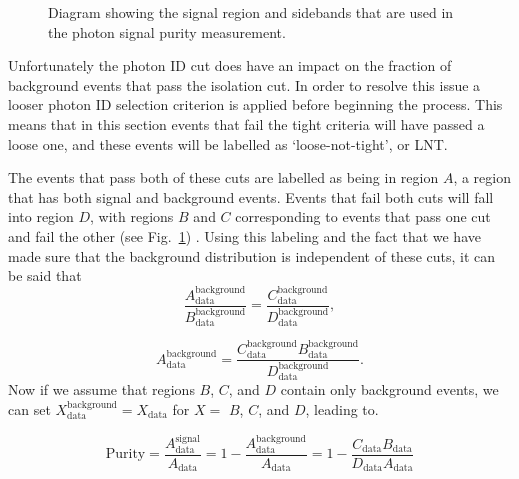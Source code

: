 \begin{figure}[!ht]
\begin{center}
\end{center}
\caption[Sideband method]
{\small Diagram showing the signal region and sidebands that are used in the photon signal purity measurement.    }
\label{ABCD}
\end{figure}

Unfortunately the photon ID cut does have an impact on the fraction of background events that pass the isolation cut.  
In order to resolve this issue a looser photon ID selection criterion is applied before beginning the process.  
This means that in this section events that fail the tight criteria will have passed a loose one, and these events will be labelled as `loose-not-tight', or LNT.  

The events that pass both of these cuts are labelled as being in region $A$, a region that has both signal and background events.
Events that fail both cuts will fall into region $D$, with regions $B$ and $C$ corresponding to events that pass one cut and fail the other (see Fig.~\ref{ABCD}) .   
Using this labeling and the fact that we have made sure that the background distribution is independent of these cuts, it can be said that
\begin{equation}
 \frac{A_{\mathrm{data}}^{\mathrm{background}}}{B_{\mathrm{data}}^{\mathrm{background}}} = \frac{C_{\mathrm{data}}^{\mathrm{background}}}{D_{\mathrm{data}}^{\mathrm{background}}},
\end{equation}

\begin{equation}
 A_{\mathrm{data}}^{\mathrm{background}} =  \frac{C_{\mathrm{data}}^{\mathrm{background}}B_{\mathrm {data}}^{\mathrm{background}}}{D_{\mathrm {data}}^{\mathrm{background}}}. 
\end{equation}
\noindent 
Now if we assume that regions $B$, $C$, and $D$ contain only background events, we can set $X_{\mathrm{data}}^{\mathrm{background}}=X_{\mathrm{data}}$ for $X=$ $B$, $C$, and $D$, leading to.   

\begin{equation}
 \label{eq:PureSimple}
 \mathrm{Purity} = \frac{A_{\mathrm{data}}^{\mathrm{signal}}}{A_{\mathrm{data}}} = 1-\frac{A_{\mathrm{data}}^{\mathrm{background}}}{A_{\mathrm{data}}} =1- \frac{C_{\mathrm{data}}B_{\mathrm{data}}}{D_{\mathrm {data}}A_{\mathrm {data}}}
\end{equation}
\noindent

